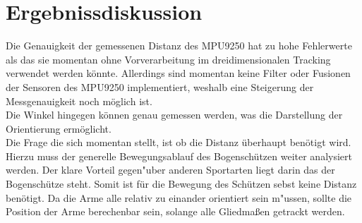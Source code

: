 \chapter{Ergebnissdiskussion}
Die Genauigkeit der gemessenen Distanz des MPU9250 hat zu hohe Fehlerwerte als 
das sie momentan ohne Vorverarbeitung im dreidimensionalen Tracking verwendet werden könnte.
Allerdings sind momentan keine Filter oder Fusionen der Sensoren des MPU9250 implementiert,
weshalb eine Steigerung der Messgenauigkeit noch möglich ist.\\
Die Winkel hingegen können genau gemessen werden, was die Darstellung der Orientierung 
ermöglicht.\\
Die Frage die sich momentan stellt, ist ob die Distanz überhaupt benötigt wird. Hierzu 
muss der generelle Bewegungsablauf des Bogenschützen weiter analysiert werden. Der klare
Vorteil gegen"uber anderen Sportarten liegt darin das der Bogenschütze steht. Somit ist 
für die Bewegung des Schützen sebst keine Distanz benötigt. Da die Arme alle relativ zu 
einander orientiert sein m"ussen, sollte die Position der Arme berechenbar sein, solange 
alle Gliedmaßen getrackt werden.